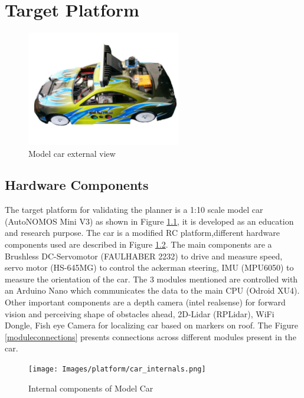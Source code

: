 \chapter{Target Platform}
\label{vehicle_info}

\begin{figure}[H]
	\centering
	\includegraphics[width=0.6\textwidth]{Images/platform/car.jpg}
	\caption{Model car external view}
	\label{model_car}
\end{figure}

\section{Hardware Components}
The target platform for validating the planner is a 1:10 scale model car (AutoNOMOS Mini V3) as shown in Figure \ref{model_car}, it is developed as an education and research purpose. The car is a modified RC platform,different hardware components used are described in Figure \ref{internalcar}. The main components are a Brushless DC-Servomotor (FAULHABER 2232) to drive and measure speed, servo
motor (HS-645MG) to control the ackerman steering, IMU (MPU6050) to measure the orientation of the car. The 3 modules mentioned are controlled with an Arduino Nano which communicates the data to the main CPU (Odroid XU4). Other important components are a depth camera (intel realsense) for forward vision and perceiving shape of obstacles ahead, 2D-Lidar (RPLidar), WiFi Dongle,  Fish eye Camera for localizing car based on markers on roof. The Figure \ref{moduleconnections} presents connections across different modules present in the car.


\begin{figure}
	\centering
	\texttt{[image: Images/platform/car\_internals.png]}
	\caption{Internal components of Model Car}
	\label{internalcar}
\end{figure}


